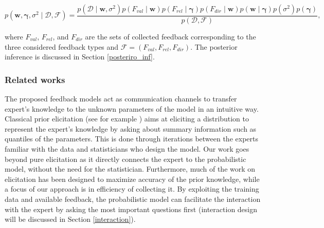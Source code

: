 \documentclass[dissertation,math,vertlayout,pdfa,colorlinks]{aaltoseries}
\newcommand{\bw}{\bm{w}}
\newcommand{\bD}{\mathcal{D}}
\newcommand{\bF}{\mathcal{F}}
\begin{document}
\begin{equation}\label{Eq:Bayes_rule_ss_reg_with_fb}
p(\bw, \bm{\gamma}, \sigma^2 \mid \bD,\bF) = \frac{p(\bD \mid \bw, \sigma^2)p(F_{val} \mid \bw)p(F_{rel} \mid \bm{\gamma})p(F_{dir} \mid \bw)p(\bw \mid \bm{\gamma})p(\sigma^2)p(\bm{\gamma})}{p(\bD,\bF)},
\end{equation} 

\noindent where $F_{val}$, $F_{rel}$, and $F_{dir}$ are the sets of collected feedback corresponding to the three considered feedback types and $\bF = (F_{val}, F_{rel}, F_{dir})$. The posterior inference is discussed in Section \ref{posteriro_inf}.




\subsubsection{Related works}

The proposed feedback models act as communication channels to transfer expert's knowledge to the unknown parameters of the model in an intuitive way. Classical prior elicitation (see for example \cite{OHagan06,garthwaite2005statistical}) aims at eliciting a distribution to represent the expert's knowledge by asking about summary information such as quantiles of the parameters. This is done through iterations between the experts familiar with the data and statisticians who design the model. Our work goes beyond pure elicitation as it directly connects the expert to the probabilistic model, without the need for the statistician. Furthermore, much of the work on elicitation has been designed to maximize accuracy of the prior knowledge, while a focus of our approach is in efficiency of collecting it. By exploiting the training data and available feedback, the probabilistic model can facilitate the interaction with the expert by asking the most important questions first (interaction design will be discussed in Section \ref{interaction}).
\end{document}
